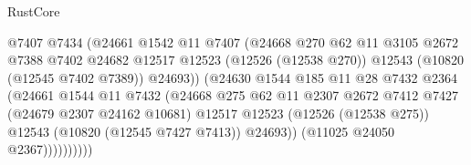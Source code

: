 \begin{lexlean}{RustCore}
\begin{coremodule}
                                          @7407
                                          @7434
                                          (@24661
                                            @1542
                                            @11
                                            @7407
                                            (@24668
                                              @270
                                              @62
                                              @11
                                              @3105
                                              @2672
                                              @7388
                                              @7402
                                              @24682
                                              @12517
                                              @12523
                                              (@12526 (@12538 @270))
                                              @12543
                                              (@10820 (@12545 @7402 @7389))
                                              @24693))
                                          (@24630
                                            @1544
                                            @185
                                            @11
                                            @28
                                            @7432
                                            @2364
                                            (@24661
                                              @1544
                                              @11
                                              @7432
                                              (@24668
                                                @275
                                                @62
                                                @11
                                                @2307
                                                @2672
                                                @7412
                                                @7427
                                                (@24679 @2307 @24162 @10681)
                                                @12517
                                                @12523
                                                (@12526 (@12538 @275))
                                                @12543
                                                (@10820 (@12545 @7427 @7413))
                                                @24693))
                                            (@11025 @24050 @2367))))))))))

\end{coremodule}
\end{lexlean}
